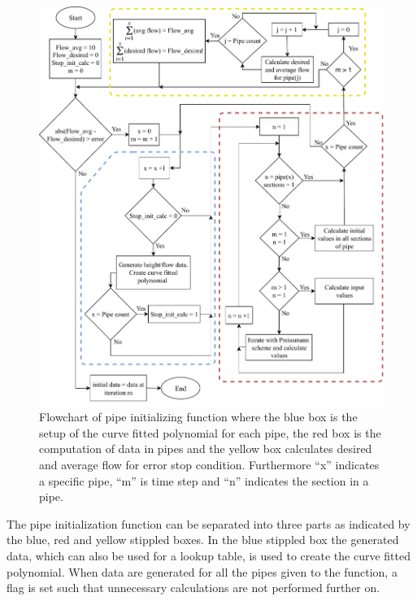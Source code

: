 \begin{figure}[H]
\centering
\includegraphics[width=1.05 \textwidth]{report/simulation/pictures/init_pipe_chart.pdf}
\caption{Flowchart of pipe initializing function where the blue box is the setup of the curve fitted polynomial for each pipe, the red box is the computation of data in pipes and the yellow box calculates desired and average flow for error stop condition. Furthermore ``x'' indicates a specific pipe, ``m'' is time step and ``n'' indicates the section in a pipe.}
\label{fig:init_pipe_chart}
\end{figure}

The pipe initialization function can be separated into three parts as indicated by the blue, red and yellow stippled boxes. In the blue stippled box the generated data, which can also be used for a lookup table, is used to create the curve fitted polynomial. When data are generated for all the pipes given to the function, a flag is set such that unnecessary calculations are not performed further on. 

